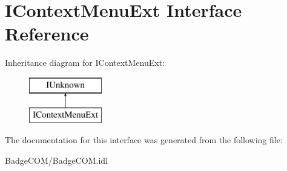 \hypertarget{interface_i_context_menu_ext}{\section{I\-Context\-Menu\-Ext Interface Reference}
\label{interface_i_context_menu_ext}
}
Inheritance diagram for I\-Context\-Menu\-Ext\-:\begin{figure}[H]
\begin{center}
\leavevmode
\includegraphics[height=2.000000cm]{interface_i_context_menu_ext}
\end{center}
\end{figure}


The documentation for this interface was generated from the following file\-:\begin{DoxyCompactItemize}
\item 
Badge\-C\-O\-M/Badge\-C\-O\-M.\-idl\end{DoxyCompactItemize}

